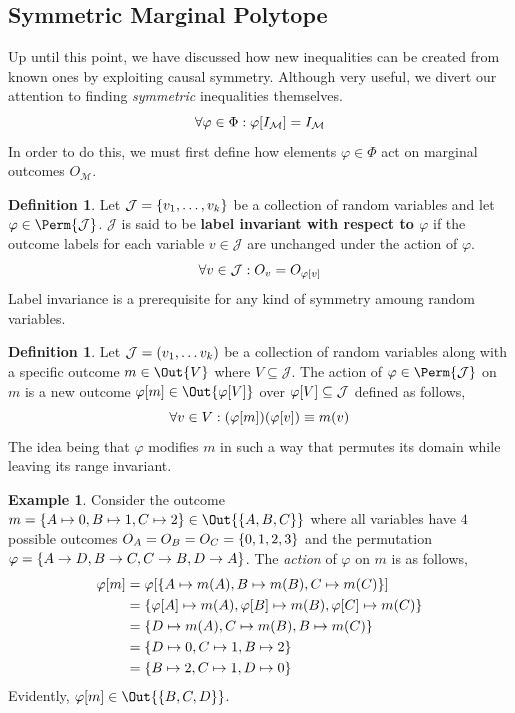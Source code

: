 \documentclass[aps, 10pt, english, twoside, pra, nofootinbib, longbibliography]{revtex4-1}
\theoremstyle{plain}
\theoremstyle{definition}
\newtheorem{definition}[theorem]{Definition}
\newtheorem{example}[theorem]{Example}
\theoremstyle{remark}
\newcommand{\gep}{\varphi}
\newcommand{\gp}{\Phi}
\newcommand{\mscenario}{\mathcal{M}}
\newcommand{\jointvar}{\mathcal{J}}
\newcommand{\term}[1]{\textcolor{Mahogany}{\textbf{#1}}}
\begin{document}
    \subsection{Symmetric Marginal Polytope}
    Up until this point, we have discussed how new inequalities can be created from known ones by exploiting causal symmetry. Although very useful, we divert our attention to finding \textit{symmetric} inequalities themselves.
    \[ \forall \gep \in \gp :  \gep\bs{I_{\mscenario}} = I_{\mscenario} \]
    In order to do this, we must first define how elements $\gep \in \gp$ act on marginal outcomes $O_{\mscenario}$.
    \begin{definition}
        Let $\jointvar = \bc{v_1, \ldots, v_k}$ be a collection of random variables and let $\gep \in \Perm{\jointvar}$. $\jointvar$ is said to be \term{label invariant with respect to $\gep$} if the outcome labels for each variable $v \in \jointvar$ are unchanged under the action of $\gep$.
        \[ \forall v \in \jointvar : O_{v} = O_{\gep\bs{v}} \]
        Label invariance is a prerequisite for any kind of symmetry amoung random variables.
    \end{definition}
    \begin{definition}
        Let $\jointvar = \br{v_1, \ldots v_k}$ be a collection of random variables along with a specific outcome $m \in \Out{V}$ where $V \subseteq \jointvar$. The action of $\gep \in \Perm{\jointvar}$ on $m$ is a new outcome $\gep\bs{m} \in \Out{\gep\bs{V}}$ over $\gep\bs{V} \subseteq \jointvar$ defined as follows,
        \[ \forall v \in V : \br{\gep\bs{m}}\br{\gep\bs{v}} \defined m \br{v} \]
        The idea being that $\gep$ modifies $m$ in such a way that permutes its domain while leaving its range invariant.
    \end{definition}
    \begin{example}
        Consider the outcome $m = \bc{A \mapsto 0, B \mapsto 1, C \mapsto 2} \in \Out{\bc{A,B,C}}$ where all variables have $4$ possible outcomes $O_A = O_B = O_C = \bc{0,1,2,3}$ and the permutation $\gep = \bc{A \to D, B \to C, C \to B, D \to A}$.
        The \textit{action} of $\gep$ on $m$ is as follows,
        \begin{align*}
            \gep\bs{m} &= \gep\bs{\bc{A \mapsto m\br{A}, B \mapsto m\br{B}, C \mapsto m\br{C}}} \\
            &= \bc{\gep\bs{A} \mapsto m\br{A}, \gep\bs{B} \mapsto m\br{B}, \gep\bs{C} \mapsto m\br{C}} \\
            &= \bc{D \mapsto m\br{A}, C \mapsto m\br{B}, B \mapsto m\br{C}} \\
            &= \bc{D \mapsto 0, C \mapsto 1, B \mapsto 2} \\
            &= \bc{B \mapsto 2, C \mapsto 1, D \mapsto 0}
        \end{align*}
        Evidently, $\gep\bs{m} \in \Out{\bc{B, C, D}}$.
    \end{example}
\end{document}
